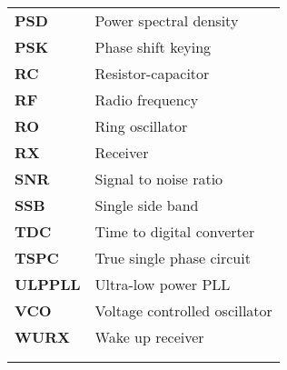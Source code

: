 \begin{tabular}{@{}ll}
		\textbf{\textsf{PSD}} & Power spectral density	\\
		\textbf{\textsf{PSK}} & Phase shift keying 	\\
		\textbf{\textsf{RC}} &  Resistor-capacitor	\\
		\textbf{\textsf{RF}} &  Radio frequency	\\
		\textbf{\textsf{RO}}& 	Ring oscillator\\
		\textbf{\textsf{RX}}& 	Receiver\\
		\textbf{\textsf{SNR}} & Signal to noise ratio 	\\
		\textbf{\textsf{SSB}}& 	Single side band\\
		\textbf{\textsf{TDC}}& 	Time to digital converter \\
		\textbf{\textsf{TSPC}}& 	True single phase circuit\\
		\textbf{\textsf{ULPPLL}} & Ultra-low power PLL 	\\
		\textbf{\textsf{VCO}}& 	Voltage controlled oscillator\\
		\textbf{\textsf{WURX}}& 	Wake up receiver\\
		& 	\\
		& 	\\
	\end{tabular}
